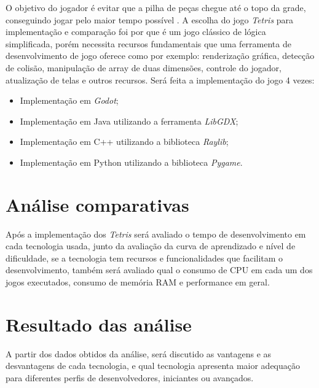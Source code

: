      O objetivo do jogador é evitar que a pilha de peças chegue até o topo da grade, conseguindo jogar pelo maior tempo possível \cite{TetrisWin}.
    A escolha do jogo \textit{Tetris} para implementação e comparação foi por que é um jogo clássico 
    de lógica simplificada, porém necessita recursos fundamentais que uma ferramenta de desenvolvimento 
    de jogo oferece como por exemplo: renderização gráfica, detecção de colisão, manipulação de array de duas
    dimensões, controle do jogador, atualização de telas e outros recursos.
    Será feita a implementação do jogo 4 vezes:
    \begin{itemize}
        \item Implementação em \textit{Godot};
        \item Implementação em Java utilizando a ferramenta \textit{LibGDX};
        \item Implementação em C++ utilizando a biblioteca \textit{Raylib};
        \item Implementação em Python utilizando a biblioteca \textit{Pygame}.
    \end{itemize}

\section{Análise comparativas}

Após a implementação dos \textit{Tetris} será avaliado o tempo de desenvolvimento em cada tecnologia usada,
junto da avaliação da curva de aprendizado e nível de dificuldade, se a tecnologia tem recursos e funcionalidades que facilitam o desenvolvimento,
também será avaliado qual o consumo de CPU em cada um dos jogos executados, consumo de memória RAM e performance em geral.

\section{Resultado das análise}

A partir dos dados obtidos da análise, será discutido as vantagens e as desvantagens de cada tecnologia, 
e qual tecnologia apresenta maior adequação para diferentes perfis de desenvolvedores, iniciantes ou avançados.

